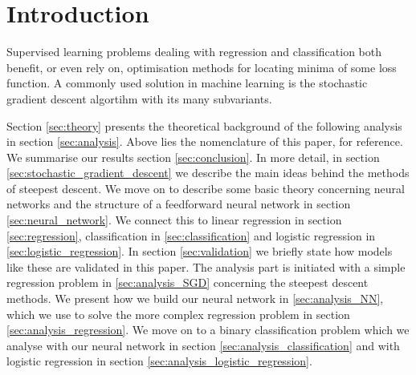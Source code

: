 \section{Introduction}\label{sec:introduction}


Supervised learning problems dealing with regression and classification both benefit, or even rely on, optimisation methods for locating minima of some loss function. A commonly used solution in machine learning is the stochastic gradient descent algortihm with its many subvariants.





Section \ref{sec:theory} presents the theoretical background of the following analysis in section \ref{sec:analysis}. Above lies the nomenclature of this paper, for reference. We summarise our results section \ref{sec:conclusion}. In more detail, in section \ref{sec:stochastic_gradient_descent} we describe the main ideas behind the methods of steepest descent. We move on to describe some basic theory concerning neural networks and the structure of a feedforward neural network in section \ref{sec:neural_network}. We connect this to linear regression in section \ref{sec:regression}, classification in \ref{sec:classification} and logistic regression in \ref{sec:logistic_regression}. In section \ref{sec:validation} we briefly state how models like these are validated in this paper. The analysis part is initiated with a simple regression problem in \ref{sec:analysis_SGD} concerning the steepest descent methods. We present how we build our neural network in \ref{sec:analysis_NN}, which we use to solve the more complex regression problem in section \ref{sec:analysis_regression}. We move on to a binary classification problem which we analyse with our neural network in section \ref{sec:analysis_classification} and with logistic regression in section \ref{sec:analysis_logistic_regression}. 
